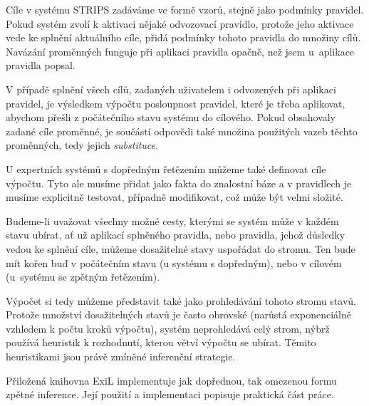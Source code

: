 Cíle v systému STRIPS zadáváme ve formě vzorů, stejně jako podmínky pravidel.
Pokud systém zvolí k aktivaci nějaké odvozovací pravidlo, protože jeho aktivace
vede ke splnění aktuálního cíle, přidá podmínky tohoto pravidla do množiny
cílů. Navázání proměnných funguje při aplikaci pravidla opačně, než jsem
u~aplikace pravidla popsal.

V případě splnění všech cílů, zadaných uživatelem i odvozených při aplikaci
pravidel, je výsledkem výpočtu posloupnost pravidel, které je třeba aplikovat,
abychom přešli z počátečního stavu systému do cílového. Pokud obsahovaly zadané
cíle proměnné, je součástí odpovědi také množina použitých vazeb těchto
proměnných, tedy jejich \emph{substituce}.

U expertních systémů s dopředným řetězením můžeme také definovat cíle výpočtu.
Tyto ale musíme přidat jako fakta do znalostní báze a v pravidlech je musíme
explicitně testovat, případně modifikovat, což může být velmi složité.

Budeme-li uvažovat všechny možné cesty, kterými se systém může v každém stavu
ubírat, ať už aplikací splněného pravidla, nebo pravidla, jehož důsledky vedou
ke splnění cíle, můžeme dosažitelné stavy uspořádat do stromu. Ten bude mít
kořen buď v počátečním stavu (u systému s dopředným), nebo v cílovém (u~systému
se zpětným řetězením).

Výpočet si tedy můžeme představit také jako prohledávání tohoto stromu stavů.
Protože množství dosažitelných stavů je často obrovské (narůstá exponenciálně
vzhledem k počtu kroků výpočtu), systém neprohledává celý strom, nýbrž používá
heuristik k rozhodnutí, kterou větví výpočtu se ubírat.  Těmito heuristikami
jsou právě zmíněné inferenční strategie.

Přiložená knihovna ExiL implementuje jak dopřednou, tak omezenou formu zpětné
inference. Její použití a implementaci popisuje praktická část práce.
